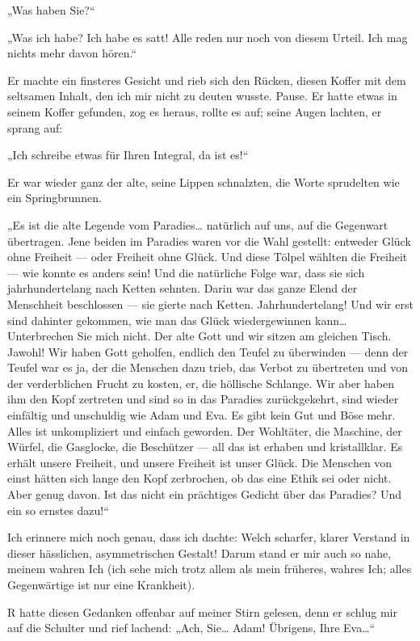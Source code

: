 „Was haben Sie?“

„Was ich habe? Ich habe es satt! Alle reden nur noch von diesem
Urteil. Ich mag nichts mehr davon hören.“

Er machte ein finsteres
Gesicht und rieb sich den Rücken, diesen Koffer mit dem seltsamen
Inhalt, den ich mir nicht zu deuten wusste. Pause. Er hatte etwas
in seinem Koffer gefunden, zog es heraus, rollte es auf; seine
Augen lachten, er sprang auf:

„Ich schreibe etwas für Ihren Integral, da ist es!“

Er war wieder
ganz der alte, seine Lippen schnalzten, die Worte sprudelten wie
ein Springbrunnen.

„Es ist die alte Legende vom Paradies\ldots{}
natürlich auf uns, auf die Gegenwart übertragen. Jene beiden im
Paradies waren vor die Wahl gestellt: entweder Glück ohne Freiheit
— oder Freiheit ohne Glück. Und diese Tölpel wählten die Freiheit —
wie konnte es anders sein! Und die natürliche Folge war, dass sie
sich jahrhundertelang nach Ketten sehnten. Darin war das ganze
Elend der Menschheit beschlossen — sie gierte nach Ketten.
Jahrhundertelang! Und wir erst sind dahinter gekommen, wie man das
Glück wiedergewinnen kann\ldots{} Unterbrechen Sie mich nicht. Der alte
Gott und wir sitzen am gleichen Tisch. Jawohl! Wir haben Gott
geholfen, endlich den Teufel zu überwinden — denn der Teufel war es
ja, der die Menschen dazu trieb, das Verbot zu übertreten und von
der verderblichen Frucht zu kosten, er, die höllische Schlange. Wir
aber haben ihm den Kopf zertreten und sind so in das Paradies
zurückgekehrt, sind wieder einfältig und unschuldig wie Adam und
Eva. Es gibt kein Gut und Böse mehr. Alles ist unkompliziert und
einfach geworden. Der Wohltäter, die Maschine, der Würfel, die
Gasglocke, die Beschützer — all das ist erhaben und kristallklar.
Es erhält unsere Freiheit, und unsere Freiheit ist unser Glück. Die
Menschen von einst hätten sich lange den Kopf zerbrochen, ob das
eine Ethik sei oder nicht. Aber genug davon. Ist das nicht ein
prächtiges Gedicht über das Paradies? Und ein so ernstes dazu!“

Ich
erinnere mich noch genau, dass ich dachte: Welch scharfer, klarer
Verstand in dieser hässlichen, asymmetrischen Gestalt! Darum stand
er mir auch so nahe, meinem wahren Ich (ich sehe mich trotz allem
als mein früheres, wahres Ich; alles Gegenwärtige ist nur eine
Krankheit).

R hatte diesen Gedanken offenbar auf meiner Stirn
gelesen, denn er schlug mir auf die Schulter und rief lachend:
„Ach, Sie\ldots{} Adam! Übrigens, Ihre Eva\ldots{}“

